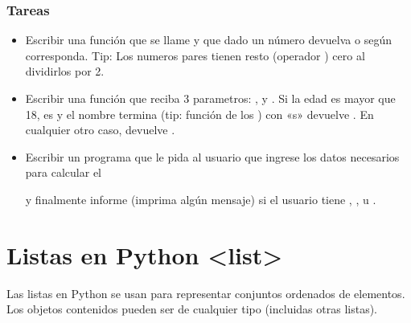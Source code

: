\documentclass[a5paper,9pt,spanish]{sphinxmanual}
\begin{document}
\subsection{Tareas}
\label{\detokenize{bool:tareas}}\begin{itemize}
\item {} 
\sphinxAtStartPar
Escribir una función que se llame  y que dado un número devuelva
 o  según corresponda. Tip: Los numeros pares tienen resto (operador \sphinxcode{\sphinxupquote{\%}})
cero al dividirlos por 2.

\item {} 
\sphinxAtStartPar
Escribir una función que reciba 3 parametros: ,  y .
Si la edad es mayor que 18,  es  y el nombre termina (tip:
función  de los ) con «s» devuelve . En cualquier otro caso,
devuelve .

\item {} 
\sphinxAtStartPar
Escribir un programa que le pida al usuario que ingrese los datos
necesarios para calcular el
%
\begin{footnote}[5]\sphinxAtStartFootnote
{}
%
\end{footnote}
y finalmente informe (imprima algún mensaje) si el usuario tiene , ,
 u .

\end{itemize}

\sphinxstepscope


\chapter{Listas en Python \textless{}list\textgreater{}}
\label{\detokenize{list:listas-en-python-list}}\label{\detokenize{list::doc}}
\sphinxAtStartPar
Las listas en Python se usan para representar conjuntos ordenados de elementos.
Los objetos contenidos pueden ser de cualquier tipo (incluidas otras listas).
\end{document}
